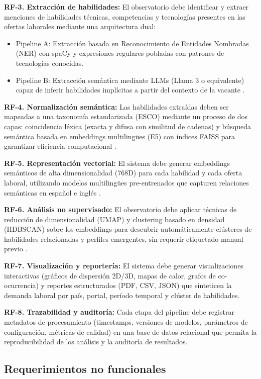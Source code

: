\textbf{RF-3. Extracción de habilidades:} El observatorio debe identificar y extraer menciones de habilidades técnicas, competencias y tecnologías presentes en las ofertas laborales mediante una arquitectura dual:
\begin{itemize}
    \item Pipeline A: Extracción basada en Reconocimiento de Entidades Nombradas (NER) con spaCy y expresiones regulares pobladas con patrones de tecnologías conocidas.
    \item Pipeline B: Extracción semántica mediante LLMs (Llama 3 o equivalente) capaz de inferir habilidades implícitas a partir del contexto de la vacante \cite{herandi2024, nguyen2024}.
\end{itemize}

\textbf{RF-4. Normalización semántica:} Las habilidades extraídas deben ser mapeadas a una taxonomía estandarizada (ESCO) mediante un proceso de dos capas: coincidencia léxica (exacta y difusa con similitud de cadenas) y búsqueda semántica basada en embeddings multilingües (E5) con índices FAISS para garantizar eficiencia computacional \cite{kavargyris2025}.

\textbf{RF-5. Representación vectorial:} El sistema debe generar embeddings semánticos de alta dimensionalidad (768D) para cada habilidad y cada oferta laboral, utilizando modelos multilingües pre-entrenados que capturen relaciones semánticas en español e inglés \cite{kavas2024}.

\textbf{RF-6. Análisis no supervisado:} El observatorio debe aplicar técnicas de reducción de dimensionalidad (UMAP) y clustering basado en densidad (HDBSCAN) sobre los embeddings para descubrir automáticamente clústeres de habilidades relacionadas y perfiles emergentes, sin requerir etiquetado manual previo \cite{lukauskas2023}.

\textbf{RF-7. Visualización y reportería:} El sistema debe generar visualizaciones interactivas (gráficos de dispersión 2D/3D, mapas de calor, grafos de co-ocurrencia) y reportes estructurados (PDF, CSV, JSON) que sinteticen la demanda laboral por país, portal, período temporal y clúster de habilidades.

\textbf{RF-8. Trazabilidad y auditoría:} Cada etapa del pipeline debe registrar metadatos de procesamiento (timestamps, versiones de modelos, parámetros de configuración, métricas de calidad) en una base de datos relacional que permita la reproducibilidad de los análisis y la auditoría de resultados.

\subsection{Requerimientos no funcionales}

